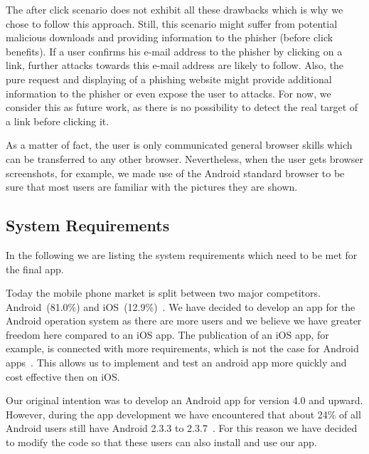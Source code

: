 \begin{description}[leftmargin=0cm]
The after click scenario does not exhibit all these drawbacks which is why we chose to follow this approach.
Still, this scenario might suffer from potential malicious downloads and providing information to the phisher (before click benefits).
If a user confirms his e-mail address to the phisher by clicking on a link, further attacks towards this e-mail address are likely to follow.
Also, the pure request and displaying of a phishing website might provide additional information to the phisher or even expose the user to attacks.
For now, we consider this as future work, as there is no possibility to detect the real target of a link before clicking it.

	\item[Considered Browser] As a matter of fact, the user is only communicated general browser skills which can be transferred to any other browser.
Nevertheless, when the user gets browser screenshots, for example, we made use of the Android standard browser to be sure that most users are familiar with the pictures they are shown.
\end{description}	

\subsection{System Requirements}
In the following we are listing the system requirements which need to be met for the final app.


\begin{description}[leftmargin=0cm]
	\item[Android] Today the mobile phone market is split between two major competitors. Android~(81.0\%) and iOS~(12.9\%)~\cite{androidiosmarketshare}. 
	We have decided to develop an app for the Android operation system as there are more users and we believe we have greater freedom here compared to an iOS app. 
 The publication of an iOS app, for example, is connected with more requirements, which is not the case for Android apps~\cite{publishios, publishandroid}. This allows us to implement and test an android app more quickly and cost effective then on iOS. 
	\item[Version] Our original intention was to develop an Android app for version 4.0 and upward.
 However, during the app development we have encountered that about 24\% of all Android users still have Android 2.3.3 to 2.3.7~\cite{versionsandroid}. For this reason we have decided to modify the code so that these users can also install and use our app.
 
\end{description}


